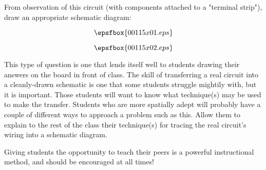 

From observation of this circuit (with components attached to a "terminal strip"), draw an appropriate schematic diagram:

$$\epsfbox{00115x01.eps}$$







$$\epsfbox{00115x02.eps}$$







This type of question is one that lends itself well to students drawing their answers on the board in front of class.  The skill of transferring a real circuit into a cleanly-drawn schematic is one that some students struggle mightily with, but it is important.  Those students will want to know what technique(s) may be used to make the transfer.  Students who are more spatially adept will probably have a couple of different ways to approach a problem such as this.  Allow them to explain to the rest of the class their technique(s) for tracing the real circuit's wiring into a schematic diagram.

Giving students the opportunity to teach their peers is a powerful instructional method, and should be encouraged at all times!




